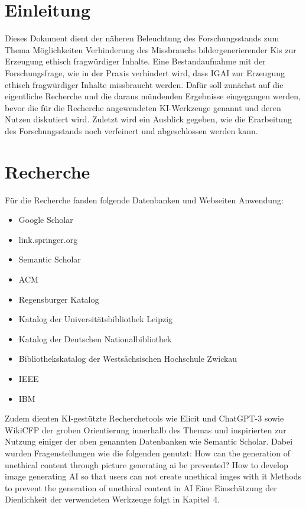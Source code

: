 
\section{Einleitung}
Dieses Dokument dient der näheren Beleuchtung des Forschungsstands zum Thema Möglichkeiten Verhinderung 
des Missbrauchs bildergenerierender Kis zur Erzeugung ethisch fragwürdiger Inhalte. Eine Bestandaufnahme 
mit der Forschungsfrage, wie in der Praxis verhindert wird, dass IGAI zur Erzeugung ethisch fragwürdiger 
Inhalte missbraucht werden. Dafür soll zunächst auf die eigentliche Recherche und die daraus mündenden 
Ergebnisse eingegangen werden, bevor die für die Recherche angewendeten KI-Werkzeuge genannt und deren 
Nutzen diskutiert wird. Zuletzt wird ein Ausblick gegeben, wie die Erarbeitung des Forschungsstands noch 
verfeinert und abgeschlossen werden kann.
\section{Recherche}
Für die Recherche fanden folgende Datenbanken und Webseiten Anwendung:
\begin{itemize}
    \item Google Scholar
    \item link.springer.org
    \item Semantic Scholar
    \item ACM
    \item Regensburger Katalog
    \item Katalog der Universitätsbibliothek Leipzig
    \item Katalog der Deutschen Nationalbibliothek
    \item Bibliothekskatalog der Westsächsischen Hochschule Zwickau
    \item IEEE
    \item IBM    
\end{itemize}

Zudem dienten KI-gestützte Recherchetools wie Elicit und ChatGPT-3 sowie WikiCFP der groben Orientierung innerhalb des Themas und inspirierten zur Nutzung einiger der oben genannten Datenbanken wie Semantic Scholar. Dabei wurden Fragenstellungen wie die folgenden genutzt:
How can the generation of unethical content through picture generating ai be prevented?
How to develop image generating AI so that users can not create unethical imges with it
Methods to prevent the generation of unethical content in AI
Eine Einschätzung der Dienlichkeit der verwendeten Werkzeuge folgt in Kapitel 4.
